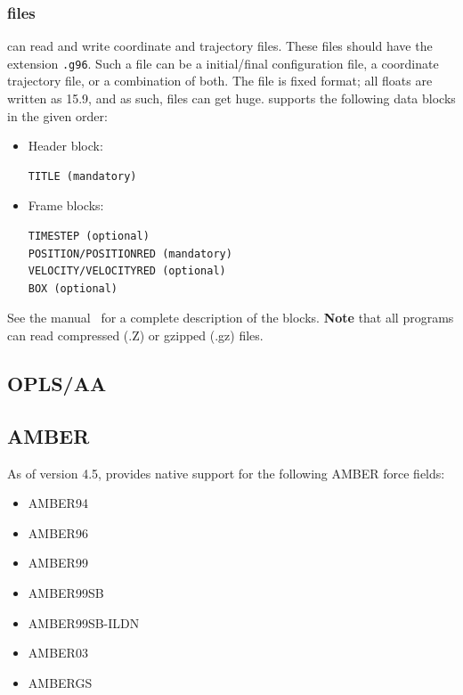 \subsubsection{ files}
{\gromacs} can read and write  coordinate and trajectory files.
These files should have the extension {\tt .g96}.
Such a file can be a  initial/final
configuration file, a coordinate trajectory file, or a combination of both.
The file is fixed format; all floats are written as 15.9, and as such, files can get huge.
{\gromacs} supports the following data blocks in the given order:
\begin{itemize}
\item Header block:
\begin{verbatim}
TITLE (mandatory)
\end{verbatim}

\item Frame blocks:
\begin{verbatim}
TIMESTEP (optional)
POSITION/POSITIONRED (mandatory)
VELOCITY/VELOCITYRED (optional)
BOX (optional)
\end{verbatim}

\end{itemize}
See the  manual~\cite{gromos96} for a complete description
of the blocks. {\bf Note} that all {\gromacs} programs can read compressed
(.Z) or gzipped (.gz) files.

\subsection{OPLS/AA}

\subsection{AMBER}

As of version 4.5, {\gromacs} provides native support for the following AMBER force fields:

\begin{itemize}
\item AMBER94~\cite{Cornell1995}
\item AMBER96~\cite{Kollman1996}
\item AMBER99~\cite{Wang2000}
\item AMBER99SB~\cite{Hornak2006}
\item AMBER99SB-ILDN~\cite{Lindorff2010}
\item AMBER03~\cite{Duan2003}
\item AMBERGS~\cite{Garcia2002}
\end{itemize}

